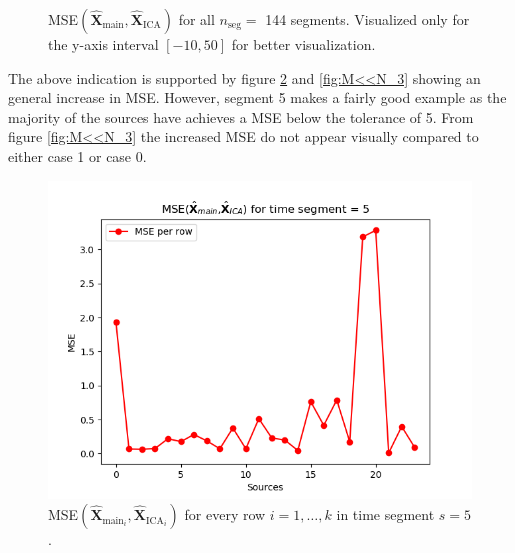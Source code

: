 \begin{figure}[H]
\begin{widepage}
\begin{minipage}[t]{.45\textwidth}
	\caption{MSE$\left(\hat{\mathbf{X}}_{\text{main}},\hat{\mathbf{X}}_{\text{ICA}}\right)$ for all $n_{\text{seg}} = $ 144 segments. Visualized only for the y-axis interval $[-10, 50]$ for better visualization.}
	\label{fig:M<<N_1_2}
    \end{minipage}
\end{widepage}
\end{figure}
\noindent 
The above indication is supported by figure \ref{fig:M<<N_2} and \ref{fig:M<<N_3} showing an general increase in MSE. 
However, segment 5 makes a fairly good example as the majority of the sources have achieves a MSE below the tolerance of 5. 
From figure \ref{fig:M<<N_3} the increased MSE do not appear visually compared to either case 1 or case 0.        
\begin{figure}[H]
\begin{widepage}
    \begin{minipage}[t]{.49\textwidth}
\centering
\includegraphics[width=1\linewidth]{figures/ch_7/resultat/mse_second_removed_ica_timeseg5.png}
\caption{MSE$\left(\hat{\mathbf{X}}_{\text{main}_{i}},\hat{\mathbf{X}}_{\text{ICA}_{i}}\right)$ for every row $i = 1, \dots, k$ in time segment $s = 5$.}
\label{fig:M<<N_2}
\end{minipage} 
\hspace{.5cm}
\begin{minipage}[t]{.49\textwidth}
\centering

\end{minipage}
\end{widepage}
\end{figure}
